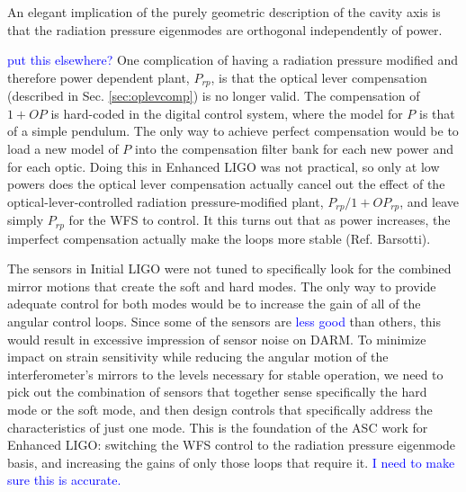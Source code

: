 An elegant implication of the purely geometric description of the
cavity axis is that the radiation pressure eigenmodes are orthogonal
independently of power. 

\textcolor{blue}{put this elsewhere?} One complication of having a
radiation pressure modified and therefore power dependent plant,
$P_{rp}$, is that the optical lever compensation (described in
Sec. \ref{sec:oplevcomp}) is no longer valid. The compensation of
$1+OP$ is hard-coded in the digital control system, where the model
for $P$ is that of a simple pendulum. The only way to achieve perfect
compensation would be to load a new model of $P$ into the compensation
filter bank for each new power and for each optic. Doing this in
Enhanced LIGO was not practical, so only at low powers does the
optical lever compensation actually cancel out the effect of the
optical-lever-controlled radiation pressure-modified plant,
$P_{rp}/1+OP_{rp}$, and leave simply $P_{rp}$ for the WFS to
control. It this turns out that as power increases, the imperfect
compensation actually make the loops more stable (Ref. Barsotti).

The sensors in Initial LIGO were not tuned to specifically look for
the combined mirror motions that create the soft and hard modes. The
only way to provide adequate control for both modes would be to
increase the gain of all of the angular control loops. Since some of
the sensors are \textcolor{blue}{less good} than others, this would
result in excessive impression of sensor noise on DARM. To minimize
impact on strain sensitivity while reducing the angular motion of the
interferometer's mirrors to the levels necessary for stable operation,
we need to pick out the combination of sensors that together sense
specifically the hard mode or the soft mode, and then design controls
that specifically address the characteristics of just one mode. This
is the foundation of the ASC work for Enhanced LIGO: switching the WFS
control to the radiation pressure eigenmode basis, and increasing the
gains of only those loops that require it. \textcolor{blue}{I need to
  make sure this is accurate.}




